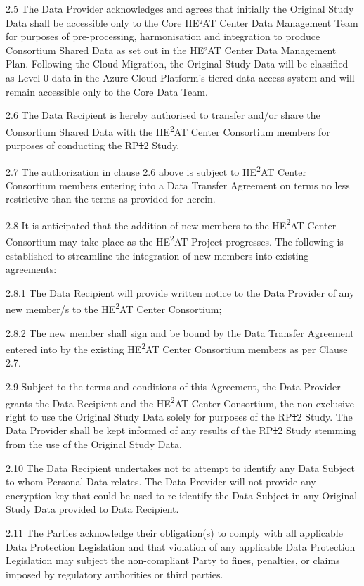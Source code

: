 \documentclass[12pt,letterpaper]{article}
\newcommand{\deleted}[1]{\textcolor{deletecolor}{\sout{#1}}}
\newcommand{\added}[1]{\textcolor{addcolor}{#1}}
\begin{document}
2.5 The Data Provider acknowledges and agrees that initially the Original Study Data shall be accessible only to the Core \added{HE²AT Center Data Management} Team for purposes of pre-processing, harmonisation and integration to produce Consortium Shared Data as set out in the HE²AT Center Data Management Plan. \added{Following the Cloud Migration, the Original Study Data will be classified as Level 0 data in the Azure Cloud Platform's tiered data access system and will remain accessible only to the Core Data Team.}

2.6 The Data Recipient is hereby authorised to transfer and/or share the Consortium Shared Data with the HE\textsuperscript{2}AT Center Consortium members for purposes of conducting the RP\deleted{1}\added{2} Study.

2.7 The authorization in clause 2.6 above is subject to HE\textsuperscript{2}AT Center Consortium members entering into a Data Transfer Agreement on terms no less restrictive than the terms as provided for herein.

2.8 It is anticipated that the addition of new members to the HE\textsuperscript{2}AT Center Consortium may take place as the HE\textsuperscript{2}AT Project progresses. The following is established to streamline the integration of new members into existing agreements:

2.8.1 The Data Recipient will provide written notice to the Data Provider of any new member/s to the HE\textsuperscript{2}AT Center Consortium;

2.8.2 The new member shall sign and be bound by the Data Transfer Agreement entered into by the existing HE\textsuperscript{2}AT Center Consortium members as per Clause 2.7.

2.9 Subject to the terms and conditions of this Agreement, the Data Provider grants the Data Recipient and the HE\textsuperscript{2}AT Center Consortium, the non-exclusive right to use the Original Study Data solely for purposes of the RP\deleted{1}\added{2} Study. The Data Provider shall be kept informed of any results of the RP\deleted{1}\added{2} Study stemming from the use of the Original Study Data.

2.10 The Data Recipient undertakes not to attempt to identify any Data Subject to whom Personal Data relates. The Data Provider will not provide any encryption key that could be used to re-identify the Data Subject in any Original Study Data provided to Data Recipient.

2.11 The Parties acknowledge their obligation(s) to comply with all applicable Data Protection Legislation and that violation of any applicable Data Protection Legislation may subject the non-compliant Party to fines, penalties, or claims imposed by regulatory authorities or third parties.
\end{document}
